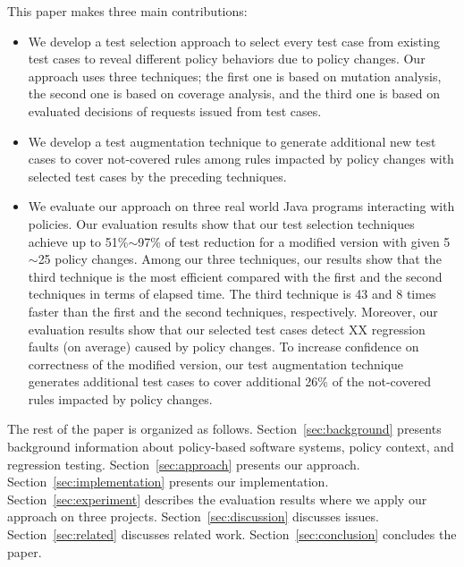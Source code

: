 





This paper makes three main contributions:

\begin{itemize}
  \item We develop a test selection approach to select every test case from existing test cases to reveal different policy behaviors due to policy changes. Our approach
  uses three techniques; the first one is based on mutation analysis, the second one is based on coverage analysis, and the third one is based on evaluated 
decisions of requests issued from test cases. 
  \item We develop a test augmentation technique to generate additional new test cases to cover not-covered rules among rules impacted by policy changes with selected test cases by the preceding techniques.

  \item We evaluate our approach on three real world Java programs interacting with policies. Our evaluation results show that our test selection techniques achieve
 up to 51\%$\sim$97\% of test reduction for a modified version with given 5$\sim$25 policy changes. Among our three techniques, our results show that the 
third technique is the most efficient compared with the first
and the second techniques in terms of elapsed time. The third technique is 43 and 8 times
faster than the first and the second techniques, respectively.
Moreover, our evaluation results show that our selected test cases detect XX regression faults (on average) caused by policy changes.
To increase confidence on correctness of the modified version, our test augmentation technique generates additional test cases to cover additional 26\% of the not-covered rules impacted by policy changes.
\end{itemize}

The rest of the paper is organized as follows.
Section~\ref{sec:background} presents background information about
policy-based software systems, policy context, and regression testing.
Section~\ref{sec:approach} presents our approach.
Section~\ref{sec:implementation} presents our implementation. 
Section~\ref{sec:experiment} describes the evaluation results
where we apply our approach on three projects.
Section~\ref{sec:discussion} discusses issues. 
Section~\ref{sec:related} discusses related
work. Section~\ref{sec:conclusion}
concludes the paper.






%
